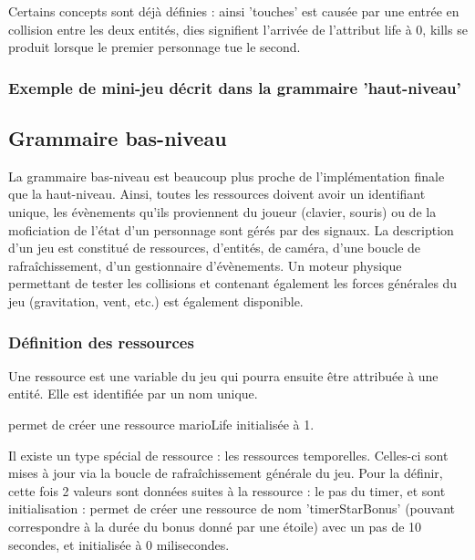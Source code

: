Certains concepts sont déjà définies : ainsi 'touches' est causée par une entrée en collision entre les deux entités, dies signifient l'arrivée de l'attribut
life à 0, kills se produit lorsque le premier personnage tue le second.

\subsubsection{Exemple de mini-jeu décrit dans la grammaire 'haut-niveau'}


\subsection{Grammaire bas-niveau}

La grammaire bas-niveau est beaucoup plus proche de l'implémentation finale que la haut-niveau.
Ainsi, toutes les ressources doivent avoir un identifiant unique, les évènements qu'ils proviennent du joueur (clavier, souris) ou de la moficiation
de l'état d'un personnage sont gérés par des signaux.
La description d'un jeu est constitué de ressources, d'entités, de caméra, d'une boucle de rafraîchissement, d'un gestionnaire d'évènements.
Un moteur physique permettant de tester les collisions et contenant également les forces générales du jeu (gravitation, vent, etc.) est également disponible.

\subsubsection{Définition des ressources}

Une ressource est une variable du jeu qui pourra ensuite être attribuée à une entité.
Elle est identifiée par un nom unique.

 permet de créer une ressource marioLife initialisée à 1.

Il existe un type spécial de ressource : les ressources temporelles.
Celles-ci sont mises à jour via la boucle de rafraîchissement générale du jeu.
Pour la définir, cette fois 2 valeurs sont données suites à la ressource : le pas du timer, et sont initialisation :
 permet de créer une ressource de nom 'timerStarBonus' (pouvant correspondre à la durée du bonus donné par une étoile)
avec un pas de 10 secondes, et initialisée à 0 milisecondes. 

